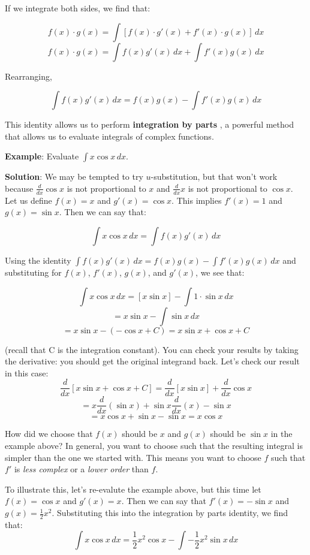 If we integrate both sides, we find that:

$$f(x) \cdot g(x) = \int \left[ f(x) \cdot g'(x) + f'(x) \cdot g(x) \right]\,dx$$
$$f(x) \cdot g(x) = \int f(x)g'(x)\,dx + \int f'(x)g(x)\,dx$$

Rearranging, 

$$\int f(x)g'(x)\,dx = f(x)g(x) - \int f'(x)g(x)\,dx$$

This identity allows us to perform \textbf{integration by parts}
, a powerful method that allows us to evaluate 
integrals of complex functions. 

\textbf{Example}: Evaluate $\int x \cos{x} \,dx$.

\textbf{Solution}: We may be tempted to try $u$-substitution, but that won't 
work because $\frac{d}{dx} \cos{x}$ is not proportional to $x$ and $\frac{d}{dx} 
x$ is not proportional to $\cos{x}$. Let us define $f(x) = x$ and $g'(x) = 
\cos{x}$. This implies $f'(x) = 1$ and $g(x) = \sin{x}$. Then we can say that:

$$\int x \cos{x} \,dx = \int f(x)g'(x)\,dx$$

Using the identity $\int f(x)g'(x)\,dx = f(x)g(x) - \int f'(x)g(x)\,dx$ and 
substituting for $f(x)$, $f'(x)$, $g(x)$, and $g'(x)$, we see that:

$$\int x \cos{x} \,dx = \left[ x \sin{x} \right] - \int 1 \cdot \sin{x}\,dx$$
$$= x \sin{x} - \int \sin{x}\,dx$$
$$= x \sin{x} - \left( -\cos{x}  + C \right) = x \sin{x} + \cos{x} + C$$

(recall that C is the integration constant). You can check your results by 
taking the derivative: you should get the original integrand back. Let's check 
our result in this case:
$$\frac{d}{dx} \left[ x \sin{x} + \cos{x} + C \right] = \frac{d}{dx} \left[x 
\sin{x} \right] + \frac{d}{dx} \cos{x}$$
$$= x \frac{d}{dx} \left( \sin{x} \right) + \sin{x} \frac{d}{dx} (x) - \sin{x}$$
$$= x \cos{x} +\sin{x} - \sin{x} = x \cos{x}$$

How did we choose that $f(x)$ should be $x$ and $g(x)$ should be $\sin{x}$ in 
the example above? In general, you want to choose such that the resulting 
integral is simpler than the one we started with. This means you want to choose 
$f$ such that $f'$ is \textit{less complex} or a \textit{lower order} than $f$. 

To illustrate this, let's re-evalute the example above, but this time let $f(x) 
= \cos{x}$ and $g'(x) = x$. Then we can say that $f'(x) = -\sin{x}$ and $g(x) 
= \frac{1}{2}x^2$. Substituting this into the integration by parts identity, 
we find that:
$$\int x \cos{x} \,dx = \frac{1}{2}x^2 \cos{x} - \int -\frac{1}{2}x^2 \sin{x}\,dx$$

